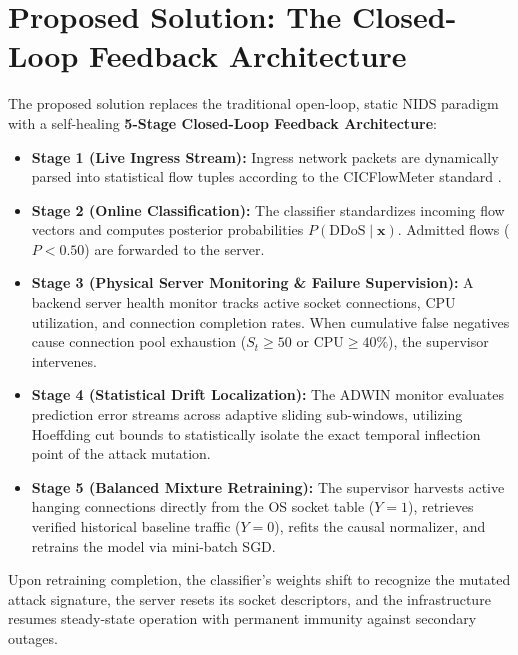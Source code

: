 \documentclass[12pt,a4paper,oneside]{report}
\begin{document}
\section{Proposed Solution: The Closed-Loop Feedback Architecture}
The proposed solution replaces the traditional open-loop, static NIDS paradigm with a self-healing \textbf{5-Stage Closed-Loop Feedback Architecture}:
\begin{itemize}
    \item \textbf{Stage 1 (Live Ingress Stream):} Ingress network packets are dynamically parsed into statistical flow tuples according to the CICFlowMeter standard \cite{lashkari2017}.
    \item \textbf{Stage 2 (Online Classification):} The classifier standardizes incoming flow vectors and computes posterior probabilities $P(\text{DDoS} \mid \mathbf{x})$. Admitted flows ($P < 0.50$) are forwarded to the server.
    \item \textbf{Stage 3 (Physical Server Monitoring \& Failure Supervision):} A backend server health monitor tracks active socket connections, CPU utilization, and connection completion rates. When cumulative false negatives cause connection pool exhaustion ($S_t \ge 50$ or $\text{CPU} \ge 40\%$), the supervisor intervenes.
    \item \textbf{Stage 4 (Statistical Drift Localization):} The ADWIN monitor evaluates prediction error streams across adaptive sliding sub-windows, utilizing Hoeffding cut bounds to statistically isolate the exact temporal inflection point of the attack mutation.
    \item \textbf{Stage 5 (Balanced Mixture Retraining):} The supervisor harvests active hanging connections directly from the OS socket table ($Y=1$), retrieves verified historical baseline traffic ($Y=0$), refits the causal normalizer, and retrains the model via mini-batch SGD.
\end{itemize}

Upon retraining completion, the classifier's weights shift to recognize the mutated attack signature, the server resets its socket descriptors, and the infrastructure resumes steady-state operation with permanent immunity against secondary outages.
\end{document}
